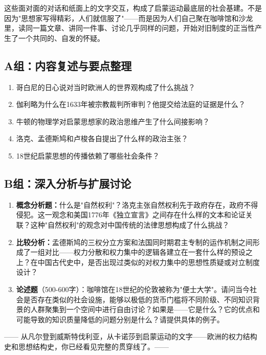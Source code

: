 \documentclass[a4paper,12pt]{ctexart}
\begin{document}
这些面对面的对话和纸面上的文字交互，构成了启蒙运动最底层的社会基建。不是因为"思想家写得精彩，人们就信服了"——而是因为人们自己聚在咖啡馆和沙龙里，读同一篇文章、讲同一件事、讨论几乎同样的问题，开始对旧制度的正当性产生了一个共同的、自发的怀疑。

\subsection*{A组：内容复述与要点整理}

\begin{enumerate}[label=A\arabic*.]
  \item 哥白尼的日心说对当时欧洲人的世界观构成了什么挑战？
  \item 伽利略为什么在1633年被宗教裁判所审判？他提交给法庭的证据是什么？
  \item 牛顿的物理学对启蒙思想家的政治思维产生了什么间接影响？
  \item 洛克、孟德斯鸠和卢梭各自提出了什么样的政治主张？
  \item 18世纪启蒙思想的传播依赖了哪些社会条件？
\end{enumerate}

\subsection*{B组：深入分析与扩展讨论}

\begin{enumerate}[label=B\arabic*.]
  \item \textbf{概念分析题：}什么是"自然权利"？洛克主张自然权利先于政府存在，政府不得侵犯。这一观念和美国1776年《独立宣言》之间存在什么样的文本和论证关联？这种"自然权利"的观念对中国传统的法律思想构成了什么挑战？
  \item \textbf{比较分析：}孟德斯鸠的三权分立方案和法国同时期君主专制的运作机制之间形成了一组对比——权力分散和权力集中的逻辑各建立在一套什么样的预设之上？在中国古代史中，是否出现过类似的对权力集中的思想性质疑或对立制度设计？
  \item \textbf{论述题}（500-600字）：咖啡馆在18世纪的伦敦被称为"便士大学"。请问当今社会是否存在类似的社会设施，能够以极低的货币门槛将不同阶级、不同知识背景的人群聚集到一个空间中进行自由讨论？如果是——它是什么？它的优点和可能导致的知识质量降低的问题分别是什么？请提供具体的例子。
\end{enumerate}

\vspace{0.5cm}
\begin{center}
\textcolor{blue!70!black}{\large —— 从凡尔登到威斯特伐利亚，从卡诺莎到启蒙运动的文字——欧洲的权力结构史和思想结构史，你已经看见完整的贯穿线了。——}
\end{center}
\end{document}
